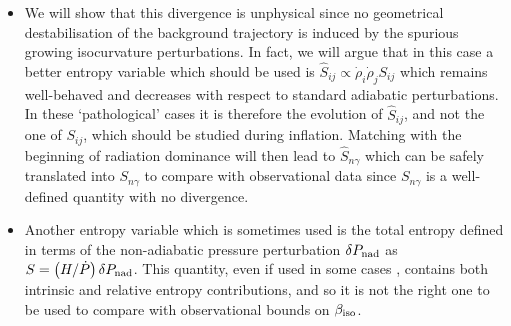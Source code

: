 \documentclass[a4paper,11pt]{article}
\begin{document}
\begin{itemize}
\item We will show that this divergence is unphysical since no geometrical destabilisation \cite{Renaux-Petel:2015mga} of the background trajectory is induced by the spurious growing isocurvature perturbations. In fact, we will argue that in this case a better entropy variable which should be used is $\hat{S}_{ij}\propto \dot\rho_i\dot\rho_j S_{ij}$ which remains well-behaved and decreases with respect to standard adiabatic perturbations. In these `pathological' cases it is therefore the evolution of $\hat{S}_{ij}$, and not the one of $S_{ij}$, which should be studied during inflation. Matching with the beginning of radiation dominance will then lead to $\hat{S}_{n\gamma}$ which can be safely translated into $S_{n\gamma}$ to compare with observational data since $S_{n\gamma}$ is a well-defined quantity with no divergence.

\item Another entropy variable which is sometimes used is the total entropy defined in terms of the non-adiabatic pressure perturbation $\delta P_{\rm nad}$ as $S = \left(H/\dot P\right)\delta P_{\rm nad}$. This quantity, even if used in some cases \cite{Huston:2011fr, Huston:2013kgl}, contains both intrinsic and relative entropy contributions, and so it is not the right one to be used to compare with observational bounds on $\beta_{\rm iso}$.


\end{itemize}
\end{document}
